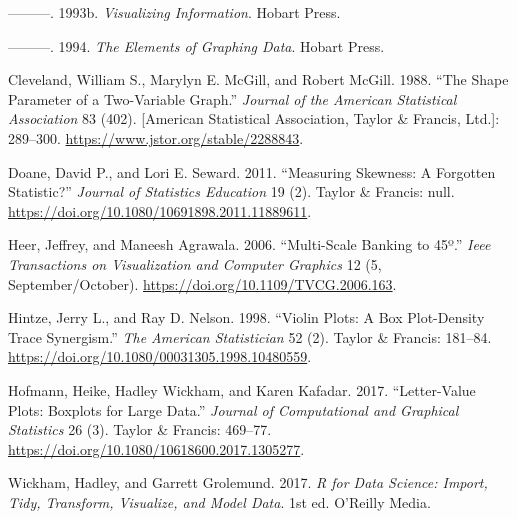 \documentclass[]{book}
\theoremstyle{plain}
\theoremstyle{remark}
\begin{document}
\leavevmode\hypertarget{ref-Cleveland1993}{}%
---------. 1993b. \emph{Visualizing Information}. Hobart Press.

\leavevmode\hypertarget{ref-Cleveland1994}{}%
---------. 1994. \emph{The Elements of Graphing Data}. Hobart Press.

\leavevmode\hypertarget{ref-ClevelandMcGillMcGill1988}{}%
Cleveland, William S., Marylyn E. McGill, and Robert McGill. 1988. ``The
Shape Parameter of a Two-Variable Graph.'' \emph{Journal of the American
Statistical Association} 83 (402). {[}American Statistical Association,
Taylor \& Francis, Ltd.{]}: 289--300.
\url{https://www.jstor.org/stable/2288843}.

\leavevmode\hypertarget{ref-DoaneSeward2011}{}%
Doane, David P., and Lori E. Seward. 2011. ``Measuring Skewness: A
Forgotten Statistic?'' \emph{Journal of Statistics Education} 19 (2).
Taylor \& Francis: null.
\url{https://doi.org/10.1080/10691898.2011.11889611}.

\leavevmode\hypertarget{ref-HeerAgrawala2006}{}%
Heer, Jeffrey, and Maneesh Agrawala. 2006. ``Multi-Scale Banking to
45º.'' \emph{Ieee Transactions on Visualization and Computer Graphics}
12 (5, September/October). \url{https://doi.org/10.1109/TVCG.2006.163}.

\leavevmode\hypertarget{ref-HintzeNelson1998}{}%
Hintze, Jerry L., and Ray D. Nelson. 1998. ``Violin Plots: A Box
Plot-Density Trace Synergism.'' \emph{The American Statistician} 52 (2).
Taylor \& Francis: 181--84.
\url{https://doi.org/10.1080/00031305.1998.10480559}.

\leavevmode\hypertarget{ref-HofmannWickhamKafadar2017}{}%
Hofmann, Heike, Hadley Wickham, and Karen Kafadar. 2017. ``Letter-Value
Plots: Boxplots for Large Data.'' \emph{Journal of Computational and
Graphical Statistics} 26 (3). Taylor \& Francis: 469--77.
\url{https://doi.org/10.1080/10618600.2017.1305277}.

\leavevmode\hypertarget{ref-WickhamGrolemund2017}{}%
Wickham, Hadley, and Garrett Grolemund. 2017. \emph{R for Data Science:
Import, Tidy, Transform, Visualize, and Model Data}. 1st ed. O'Reilly
Media.
\end{document}
